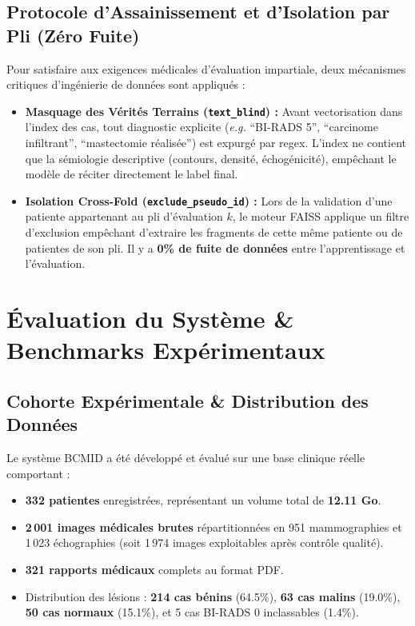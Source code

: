 \documentclass[11pt,a4paper]{article}
\begin{document}
\subsection{Protocole d'Assainissement et d'Isolation par Pli (Zéro Fuite)}
Pour satisfaire aux exigences m\'edicales d'\'evaluation impartiale, deux m\'ecanismes critiques d'ing\'enierie de donn\'ees sont appliqu\'es :
\begin{itemize}
    \item \textbf{Masquage des Vérités Terrains (\texttt{text\_blind}) :} Avant vectorisation dans l'index des cas, tout diagnostic explicite (\textit{e.g.} ``BI-RADS 5'', ``carcinome infiltrant'', ``mastectomie r\'ealis\'ee'') est expurg\'e par regex. L'index ne contient que la s\'emiologie descriptive (contours, densit\'e, \'echog\'enicit\'e), emp\^echant le mod\`ele de r\'eciter directement le label final.
    \item \textbf{Isolation Cross-Fold (\texttt{exclude\_pseudo\_id}) :} Lors de la validation d'une patiente appartenant au pli d'\'evaluation $k$, le moteur FAISS applique un filtre d'exclusion emp\^echant d'extraire les fragments de cette m\^eme patiente ou de patientes de son pli. Il y a \textbf{0\% de fuite de donn\'ees} entre l'apprentissage et l'\'evaluation.
\end{itemize}

\section{Évaluation du Système \& Benchmarks Expérimentaux}
\label{sec:system_evaluation}

\subsection{Cohorte Expérimentale \& Distribution des Données}
Le syst\`eme BCMID a \'et\'e d\'evelopp\'e et \'evalu\'e sur une base clinique r\'eelle comportant :
\begin{itemize}
    \item \textbf{332 patientes} enregistr\'ees, repr\'esentant un volume total de \textbf{12.11 Go}.
    \item \textbf{2\,001 images m\'edicales brutes} r\'epartitionn\'ees en 951 mammographies et 1\,023 \'echographies (soit 1\,974 images exploitables apr\`es contr\^ole qualit\'e).
    \item \textbf{321 rapports m\'edicaux} complets au format PDF.
    \item Distribution des l\'esions : \textbf{214 cas b\'enins} (64.5\%), \textbf{63 cas malins} (19.0\%), \textbf{50 cas normaux} (15.1\%), et 5 cas BI-RADS 0 inclassables (1.4\%).
\end{itemize}
\end{document}
